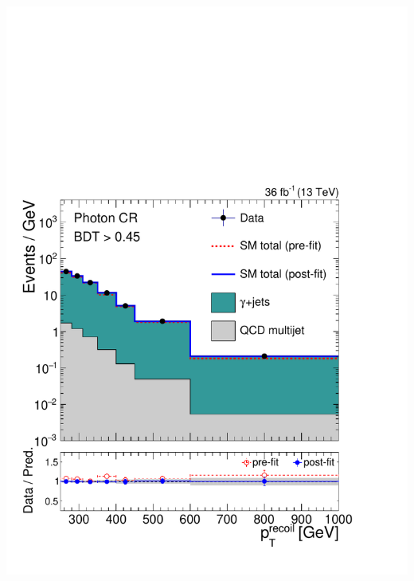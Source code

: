 \documentclass[aspectratio=169,xcolor=dvipsnames,,table,compress]{beamer}
\begin{document}
\begin{frame}[t]
\begin{columns}[T]
\begin{column}{0.125\textwidth}
      \includegraphics[width=\textwidth]{../figures/monotop/postfit/stackedPostfit_photon_monotop.pdf}\\ 

\end{column}
\end{columns}
\end{frame}
\end{document}
